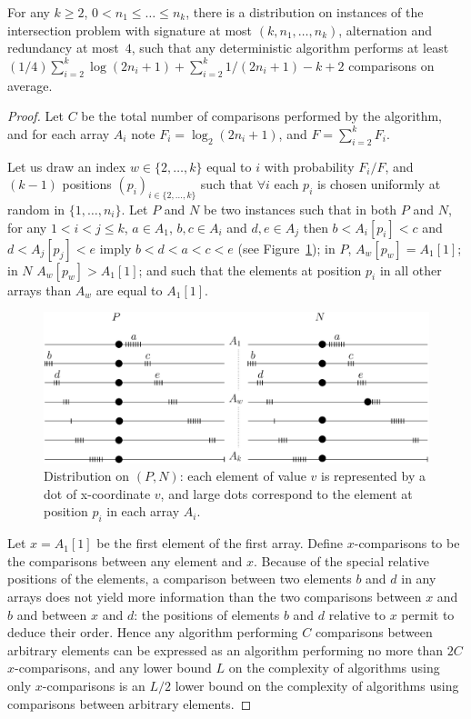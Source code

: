 \begin{lemma}\label{lem:elementproblem}
For any $k\geq 2$, $0{<}n_1{\leq}\ldots{\leq}n_k$, there is a
distribution on instances of the intersection problem with signature
at most $(k,n_1,\ldots,n_k)$, alternation and redundancy at most~$4$,
such that any deterministic algorithm performs at least
${(1/4)}\sum_{i=2}^k\log(2n_i+1)+\sum_{i=2}^k{1/(2n_i{+}1)}-k{+}2$
comparisons on average.
\end{lemma}
\begin{proof}
Let $C$ be the total number of comparisons performed by the algorithm,
and for each array $A_i$ note $F_i=\log_2(2n_i+1)$, and $F=\sum_{i=2}^k F_i$.

Let us draw an index $w\in\{2,\ldots,k\}$ equal to $i$ with probability
${F_i/F}$,
%
and $(k-1)$ positions $(p_i)_{i\in\{2,\ldots,k\}}$ such that $\forall i$
each $p_i$ is chosen uniformly at random in $\{1,\ldots,n_i\}$.
%
Let $P$ and $N$ be two instances such that
%
 in both $P$ and $N$, for any $1{<}i{<}j{\leq}k$, $a{\in}A_1$, 
$b,c{\in}A_i$ and $d,e{\in}A_j$ then  $b{<}A_i[p_i]{<}c$ and $d{<}A_j[p_j]{<}e$ imply 
$b{<}d{<}a{<}c{<}e$ (see Figure~\ref{fig:PandNdistribution});
%
in $P$, $A_{w}[p_{w}]{=}A_1[1]$; 
%
in $N$ $A_{w}[p_{w}]{>}A_1[1]$;
%
and such that the elements at position $p_i$ in all other arrays
than $A_w$ are equal to $A_1[1]$.

\begin{figure}
\centerline{\includegraphics[angle=0,width=12cm]{PNdistribution}}
\caption{Distribution on $(P,N)$: each element of value $v$ is
represented by a dot of x-coordinate $v$, and large dots correspond to
the element at position $p_i$ in each array
$A_i$. \label{fig:PandNdistribution}}
\end{figure}

Let $x=A_1[1]$ be the first element of the first array.
%
Define $x$-comparisons to be the comparisons between any element and $x$.
%
Because of the special relative positions of the elements, a
comparison between two elements $b$ and $d$ in any arrays does not
yield more information than the two comparisons between $x$ and $b$
and between $x$ and $d$: the positions of elements $b$ and $d$
relative to $x$ permit to deduce their order.
%
Hence any algorithm performing $C$ comparisons between arbitrary
elements can be expressed as an algorithm performing no more than $2C$
$x$-comparisons, and any lower bound $L$ on the complexity of
algorithms using only $x$-comparisons is an $L/2$ lower bound on the
complexity of algorithms using comparisons between arbitrary elements.


\end{proof}
